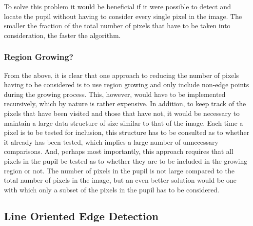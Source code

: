 To solve this problem it would be beneficial if it were possible to
detect and locate the pupil without having to consider every single
pixel in the image.  The smaller the fraction of the total number of
pixels that have to be taken into consideration, the faster the
algorithm.

\subsubsection{Region Growing?}

From the above, it is clear that one approach to reducing the number
of pixels having to be considered is to use region growing and only
include non-edge points during the growing process.  This, however,
would have to be implemented recursively, which by nature is rather
expensive.  In addition, to keep track of the pixels that have been
visited and those that have not, it would be necessary to maintain a
large data structure of size similar to that of the image.  Each time
a pixel is to be tested for inclusion, this structure has to be
consulted as to whether it already has been tested, which implies a
large number of unnecessary comparisons.  And, perhaps most
importantly, this approach requires that all pixels in the pupil be
tested as to whether they are to be included in the growing region or
not.  The number of pixels in the pupil is not large compared to the
total number of pixels in the image, but an even better solution would
be one with which only a subset of the pixels in the pupil has to be
considered.

\subsection{Line Oriented Edge Detection}
\label{eval:approach:edge}


